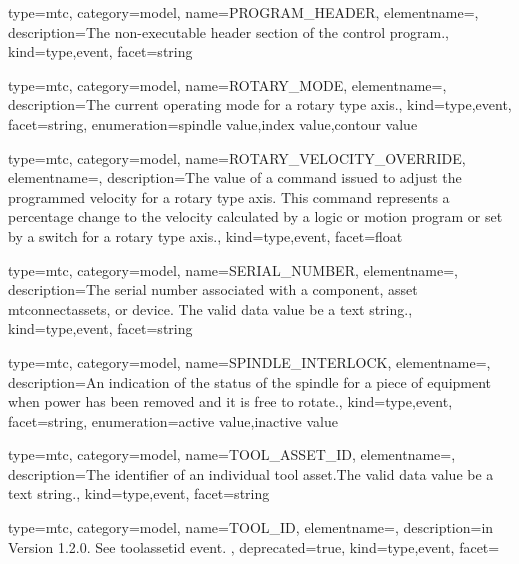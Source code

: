 {
  type=mtc,
  category=model,
  name={PROGRAM\_HEADER},
  elementname=,
  description={The non-executable header section of the control program.},
  kind={type,event},
  facet={\gls{string}}
}


{
  type=mtc,
  category=model,
  name={ROTARY\_MODE},
  elementname=,
  description={The current operating mode for a \gls{rotary} type axis.},
  kind={type,event},
  facet={\gls{string}},
  enumeration={\gls{spindle value},\gls{index value},\gls{contour value}}
}


{
  type=mtc,
  category=model,
  name={ROTARY\_VELOCITY\_OVERRIDE},
  elementname=,
  description={The value of a command issued to adjust the programmed velocity for a \gls{rotary} type axis. This command represents a percentage change to the velocity calculated by a logic or motion program or set by a switch for a \gls{rotary} type axis.},
  kind={type,event},
  facet={\gls{float}}
}


{
  type=mtc,
  category=model,
  name={SERIAL\_NUMBER},
  elementname=,
  description={The serial number associated with a \gls{component}, \gls{asset mtconnectassets}, or \gls{device}. The \gls{valid data value} \must be a text string.},
  kind={type,event},
  facet={\gls{string}}
}


{
  type=mtc,
  category=model,
  name={SPINDLE\_INTERLOCK},
  elementname=,
  description={An indication of the status of the spindle for a piece of equipment when power has been removed and it is free to rotate.},
  kind={type,event},
  facet={\gls{string}},
  enumeration={\gls{active value},\gls{inactive value}}
}


{
  type=mtc,
  category=model,
  name={TOOL\_ASSET\_ID},
  elementname=,
  description={The identifier of an individual tool asset.The \gls{valid data value} \must be a text string.},
  kind={type,event},
  facet={\gls{string}}
}


{
  type=mtc,
  category=model,
  name={TOOL\_ID},
  elementname=,
  description={\DEPRECATED in Version 1.2.0.   See \gls{toolassetid event}. },
  deprecated={true},
  kind={type,event},
  facet={}
}


